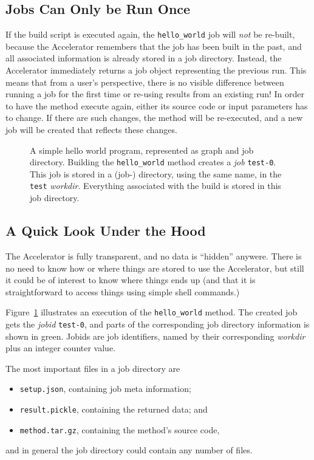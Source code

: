 \subsection{Jobs Can Only be Run Once}
If the build script is executed again, the \texttt{hello\_world} job
will \emph{not} be re-built, because the Accelerator remembers that
the job has been built in the past, and all associated information is
already stored in a job directory.  Instead, the Accelerator
immediately returns a job object representing the previous run.  This
means that from a user's perspective, there is no visible difference
between running a job for the first time or re-using results from an
existing run!  In order to have the method execute again, either its
source code or input parameters has to change.  If there are such
changes, the method will be re-executed, and a new job will be created
that reflects these changes.


\begin{figure}[b!]
  \hspace{1.5cm}
    \caption{A simple hello world program, represented as graph and
      job directory.  Building the \texttt{hello\_world} method
      creates a \emph{job} \texttt{test-0}.  This job is stored in a
      (job-) directory, using the same name, in the \texttt{test}
      \emph{workdir}.  Everything associated with the build is stored
      in this job directory.}
    \label{fig:execflow-hello-world}
\end{figure}


\clearpage


\subsection{A Quick Look Under the Hood}
The Accelerator is fully transparent, and no data is ``hidden''
anywere.  There is no need to know how or where things are stored to
use the Accelerator, but still it could be of interest to know where
things ends up (and that it is straightforward to access things using
simple shell commands.)

Figure~\ref{fig:execflow-hello-world} illustrates an execution of the
\texttt{hello\_world} method.  The created job gets the \textsl{jobid}
\texttt{test-0}, and parts of the corresponding job directory
information is shown in green.  Jobids are job identifiers, named by
their corresponding \textsl{workdir} plus an integer counter value.


The most important files in a job directory are
\begin{itemize}
\item[] \texttt{setup.json}, containing job meta information;
\item[] \texttt{result.pickle}, containing the returned data; and
\item[] \texttt{method.tar.gz}, containing the method's source code,
\end{itemize}
and in general the job directory could contain any number of files.

